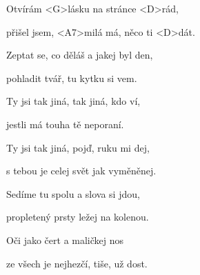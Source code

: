 

\zs
Otvírám <G>lásku na stránce <D>rád,

přišel jsem, <A7>milá má, něco ti <D>dát.

Zeptat se, co děláš a jakej byl den,

pohladit tvář, tu kytku si vem.
\ks

\zr
Ty jsi tak jiná, tak jiná, kdo ví,

jestli má touha tě neporaní.

Ty jsi tak jiná, pojď, ruku mi dej,

s tebou je celej svět jak vyměněnej.
\kr

\zs
Sedíme tu spolu a slova si jdou,

propletený prsty ležej na kolenou.

Oči jako čert a maličkej nos

ze všech je nejhezčí, tiše, už dost.
\ks

\zr
\kr

\kp
